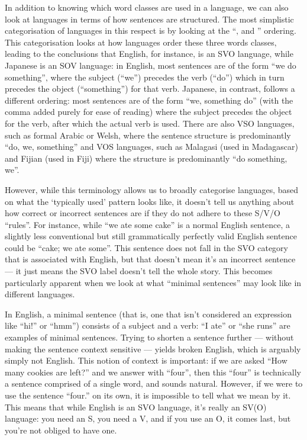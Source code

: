 \documentclass[11pt, b5paper, twoside, openright, onecolumn]{book}
\begin{document}
In addition to knowing which word classes are used in a language‚ we can also look at languages in terms of how sentences are structured. The most simplistic categorisation of languages in this respect is by looking at the “‚  and ” ordering. This categorisation looks at how languages order these three words classes‚ leading to the conclusions that English‚ for instance‚ is an SVO language‚ while Japanese is an SOV language: in English‚ most sentences are of the form “we do something”‚ where the subject (“we”) precedes the verb (“do”) which in turn precedes the object (“something”) for that verb. Japanese‚ in contrast‚ follows a different ordering: most sentences are of the form “we‚ something do” (with the comma added purely for ease of reading) where the subject precedes the object for the verb‚ after which the actual verb is used. There are also VSO languages‚ such as formal Arabic or Welsh‚ where the sentence structure is predominantly “do‚ we‚ something” and VOS languages‚ such as Malagasi (used in Madagascar) and Fijian (used in Fiji) where the structure is predominantly “do something‚ we”.

However‚ while this terminology allows us to broadly categorise languages‚ based on what the ‘typically used’ pattern looks like‚ it doesn’t tell us anything about how correct or incorrect sentences are if they do not adhere to these S/V/O “rules”. For instance‚ while “we ate some cake” is a normal English sentence‚ a slightly less conventional but still grammatically perfectly valid English sentence could be “cake; we ate some”. This sentence does not fall in the SVO category that is associated with English‚ but that doesn’t mean it’s an incorrect sentence — it just means the SVO label doesn’t tell the whole story. This becomes particularly apparent when we look at what “minimal sentences” may look like in different languages.

In English‚ a minimal sentence (that is‚ one that isn’t considered an expression like “hi!” or “hmm”) consists of a subject and a verb: “I ate” or “she runs” are examples of minimal sentences. Trying to shorten a sentence further — without making the sentence context sensitive — yields broken English‚ which is arguably simply not English. This notion of context is important: if we are asked “How many cookies are left?” and we answer with “four”‚ then this “four” is technically a sentence comprised of a single word‚ and sounds natural. However‚ if we were to use the sentence “four.” on its own‚ it is impossible to tell what we mean by it. This means that while English is an SVO language‚ it’s really an SV(O) language: you need an S‚ you need a V‚ and if you use an O‚ it comes last‚ but you’re not obliged to have one.
\end{document}
